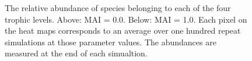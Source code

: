 \begin{itemize}
\begin{figure}[h!]
	\centering	
	\caption{The relative abundance of species belonging to each of the four trophic levels. Above: MAI = 0.0. Below: MAI = 1.0. Each pixel on the heat maps corresponds to an average over one hundred repeat simulations at those parameter values. The abundances are measured at the end of each simualtion.}
	\label{fig:rel_abun_tl_mai_01}
\end{figure}



\end{itemize}
